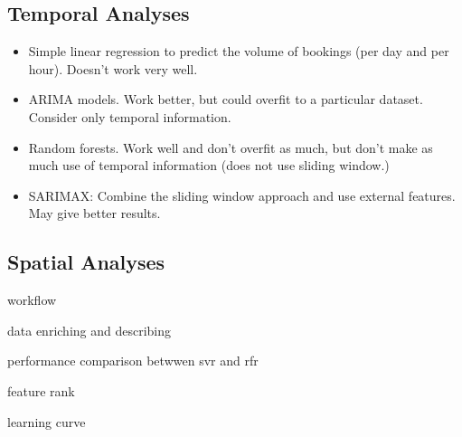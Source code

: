 \subsection{Temporal Analyses}
\begin{itemize}
    \item {Simple linear regression to predict the volume of bookings (per day and per hour). Doesn't work very well.}
    \item {ARIMA models. Work better, but could overfit to a particular dataset. Consider only temporal information.}
    \item {Random forests. Work well and don't overfit as much, but don't make as much use of temporal information (does not use sliding window.)}
    \item {SARIMAX: Combine the sliding window approach and use external features. May give better results.}
\end{itemize}

\subsection{Spatial Analyses}
    
    \item{workflow}
    \item{data enriching and describing}
    \item{performance comparison betwwen svr and rfr}
    \item{feature rank}
    \item{learning curve}
\begin{itemize}

\end{itemize}



